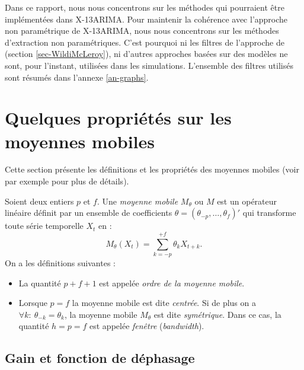 \documentclass[
  11pt,
  french,
  a4paper]{article}
\newcommand\1{\mathds{1}}
\begin{document}
Dans ce rapport, nous nous concentrons sur les méthodes qui pourraient être implémentées dans X-13ARIMA.
Pour maintenir la cohérence avec l'approche non paramétrique de X-13ARIMA, nous nous concentrons sur les méthodes d'extraction non paramétriques.
C'est pourquoi ni les filtres de l'approche de \textcite{trilemmaWMR2019} (section \ref{sec-WildiMcLeroy}), ni d'autres approches basées sur des modèles ne sont, pour l'instant, utilisées dans les simulations.
L'ensemble des filtres utilisés sont résumés dans l'annexe \ref{an-graphs}.

\hypertarget{sec-propMM}{%
\section{Quelques propriétés sur les moyennes mobiles}\label{sec-propMM}}

Cette section présente les définitions et les propriétés des moyennes mobiles (voir par exemple \textcite{ch12HBSA} pour plus de détails).

Soient deux entiers \(p\) et \(f\).
Une \emph{moyenne mobile} \(M_\theta\) ou \(M\) est un opérateur linéaire définit par un ensemble de coefficients \(\theta=(\theta_{-p},\dots,\theta_{f})'\) qui transforme toute série temporelle \(X_t\) en :
\[
M_\theta(X_t)=\sum_{k=-p}^{+f}\theta_kX_{t+k}.
\]
On a les définitions suivantes :

\begin{itemize}
\item
  La quantité \(p+f+1\) est appelée \emph{ordre de la moyenne mobile}.
\item
  Lorsque \(p=f\) la moyenne mobile est dite \emph{centrée}.
  Si de plus on a \(\forall k:\:\theta_{-k} = \theta_k\), la moyenne mobile \(M_\theta\) est dite \emph{symétrique}.
  Dans ce cas, la quantité \(h=p=f\) est appelée \emph{fenêtre} (\emph{bandwidth}).
\end{itemize}

\hypertarget{gain-et-fonction-de-duxe9phasage}{%
\subsection{Gain et fonction de déphasage}\label{gain-et-fonction-de-duxe9phasage}}
\end{document}
